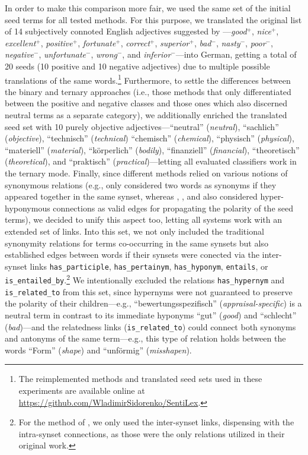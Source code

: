 In order to make this comparison more fair, we used the same set of
the initial seed terms for all tested methods.  For this purpose, we
translated the original list of 14 subjectively connoted English
adjectives suggested by \citet{Turney:03}---\emph{good}$^+$,
\emph{nice}$^+$, \emph{excellent}$^+$, \emph{positive}$^+$,
\emph{fortunate}$^+$, \emph{correct}$^+$, \emph{superior}$^+$,
\emph{bad}$^-$, \emph{nasty}$^-$, \emph{poor}$^-$,
\emph{negative}$^-$, \emph{unfortunate}$^-$, \emph{wrong}$^-$, and
\emph{inferior}$^-$---into German, getting a total of 20 seeds (10
positive and 10 negative adjectives) due to multiple possible
translations of the same words.\footnote{The reimplemented methods and
  translated seed sets used in these experiments are available online
  at \url{https://github.com/WladimirSidorenko/SentiLex}.}
Furthermore, to settle the differences between the binary and ternary
approaches (i.e., those methods that only differentiated between the
positive and negative classes and those ones which also discerned
neutral terms as a separate category), we additionally enriched the
translated seed set with 10 purely objective adjectives---``neutral''
(\emph{neutral}), ``sachlich'' (\emph{objective}), ``technisch''
(\emph{technical}) ``chemisch'' (\emph{chemical}), ``physisch''
(\emph{physical}), ``materiell'' (\emph{material}), ``k\"orperlich''
(\emph{bodily}), ``finanziell'' (\emph{financial}), ``theoretisch''
(\emph{theoretical}), and ``praktisch'' (\emph{practical})---letting
all evaluated classifiers work in the ternary mode.  Finally, since
different methods relied on various notions of synonymous relations
(e.g., \citet{Hu:04} only considered two words as synonyms if they
appeared together in the same synset, whereas \citet{Esuli:06c},
\citet{Rao:09}, and \citet{Awadallah:10} also considered
hyper-hyponymous connections as valid edges for propagating the
polarity of the seed terms), we decided to unify this aspect too,
letting all systems work with an extended set of links.  Into this
set, we not only included the traditional synonymity relations for
terms co-occurring in the same synsets but also established edges
between words if their synsets were conected via the inter-synset
links \texttt{has\_participle}, \texttt{has\_pertainym},
\texttt{has\_hyponym}, \texttt{entails}, or
\texttt{is\_entailed\_by}.\footnote{For the method of
  \citet{Esuli:06c}, we only used the inter-synset links, dispensing
  with the intra-synset connections, as those were the only relations
  utilized in their original work.} We intentionally excluded the
relations \texttt{has\_hypernym} and \texttt{is\_related\_to} from
this set, since hypernyms were not guaranteed to preserve the polarity
of their children---e.g., ``bewertungsspezifisch''
(\emph{appraisal-specific}) is a neutral term in contrast to its
immediate hyponyms ``gut'' (\emph{good}) and ``schlecht''
(\emph{bad})---and the relatedness links (\texttt{is\_related\_to})
could connect both synonyms and antonyms of the same term---e.g., this
type of relation holds between the words ``Form'' (\emph{shape}) and
``unf\"ormig'' (\emph{misshapen}).

